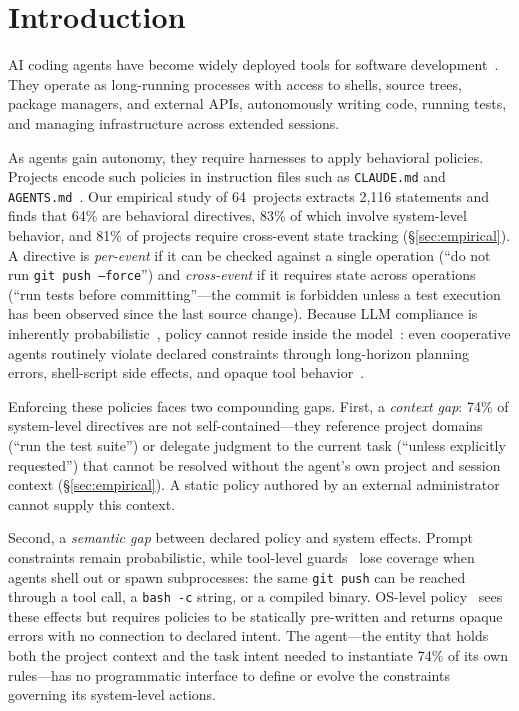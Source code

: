 \section{Introduction}


AI coding agents have become widely deployed tools for software
development~\cite{agentsight}. They operate as long-running processes with
access to shells, source trees, package managers, and external APIs,
autonomously writing code, running tests, and managing infrastructure across
extended sessions.

As agents gain autonomy, they require harnesses to apply behavioral
policies. Projects encode such policies in instruction files such
as \texttt{CLAUDE.md} and
\texttt{AGENTS.md}~\cite{chatlatanagulchai2025manifests,lulla2026agentsmd}.
Our empirical study of 64~projects extracts 2{,}116 statements and finds
that 64\% are behavioral directives, 83\% of which involve system-level
behavior, and 81\% of projects require cross-event state tracking
(\S\ref{sec:empirical}).
A directive is \emph{per-event} if it can be checked against a single
operation (``do not run \texttt{git push --force}'') and
\emph{cross-event} if it requires state across operations (``run tests
before committing''---the commit is forbidden unless a test execution
has been observed since the last source change).
Because LLM compliance is inherently
probabilistic~\cite{liu2024lost}, policy cannot reside inside the
model~\cite{langchain-harness,fowler-harness}: even cooperative agents
routinely violate declared constraints through long-horizon planning
errors, shell-script side effects, and opaque tool
behavior~\cite{jimenez2024swebench}.

Enforcing these policies faces two compounding gaps. First, a
\emph{context gap}: 74\% of system-level directives are not
self-contained---they reference project domains (``run the test suite'')
or delegate judgment to the current task (``unless explicitly
requested'') that cannot be resolved without the agent's own project
and session context (\S\ref{sec:empirical}). A static policy authored
by an external administrator cannot supply this context.

Second, a \emph{semantic gap} between declared policy and system effects.
Prompt constraints remain probabilistic, while tool-level
guards~\cite{wang2025agentspec,shi2025progent} lose coverage when agents
shell out or spawn subprocesses: the same \texttt{git~push} can be reached
through a tool call, a \texttt{bash~-c} string, or a compiled binary.
OS-level policy~\cite{ciliumtetragon,flume,pasquier2018camquery} sees
these effects but requires policies to be statically pre-written and
returns opaque errors with no connection to declared intent.
The agent---the entity that holds both the project context and the
task intent needed to instantiate 74\% of its own rules---has no
programmatic interface to define or evolve the constraints governing
its system-level actions.

